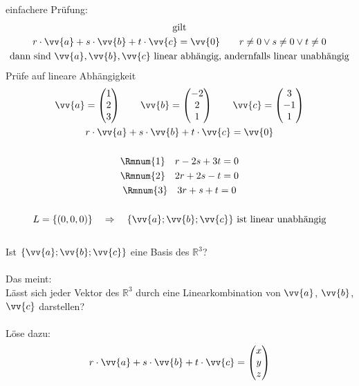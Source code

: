 einfachere Prüfung:
\begin{gather*}
  \text{gilt} \\
  r \cdot \vv{a} + s \cdot \vv{b} + t \cdot \vv{c} = \vv{0} \qquad r \neq 0 \lor s \neq 0 \lor t \neq 0 \\
  \text{dann sind $\vv{a}, \vv{b}, \vv{c}$ linear abhängig, andernfalls linear unabhängig}
\end{gather*}
Prüfe auf lineare Abhängigkeit
\begin{gather*}
  \vv{a} = \begin{pmatrix}1 \\ 2 \\ 3\end{pmatrix} \qquad \vv{b} = \begin{pmatrix}-2 \\ 2 \\ 1\end{pmatrix} \qquad \vv{c} = \begin{pmatrix}3 \\ -1 \\ 1\end{pmatrix} \\
  r \cdot \vv{a} + s \cdot \vv{b} + t \cdot \vv{c} = \vv{0} \\\\
  \text{\Rmnum{1}} \quad r - 2s + 3t = 0 \\
  \text{\Rmnum{2}} \quad 2r + 2s - t = 0 \\
  \text{\Rmnum{3}} \quad 3r + s + t = 0 \\\\
  L = \{(0, 0, 0)\} \quad\Rightarrow\quad \text{$\left\{\vv{a}; \vv{b}; \vv{c}\right\}$ ist linear unabhängig}
\end{gather*} \\
Ist $\left\{\vv{a}; \vv{b}; \vv{c}\right\}$ eine Basis des $\mathbb{R}^3$? \\\\
Das meint: \\
Lässt sich jeder Vektor des $\mathbb{R}^3$ durch eine Linearkombination von $\vv{a}$, $\vv{b}$, $\vv{c}$ darstellen? \\\\
Löse dazu:
\begin{gather*}
  r \cdot \vv{a} + s \cdot \vv{b} + t \cdot \vv{c} = \begin{pmatrix}x \\ y \\ z\end{pmatrix}
\end{gather*}

